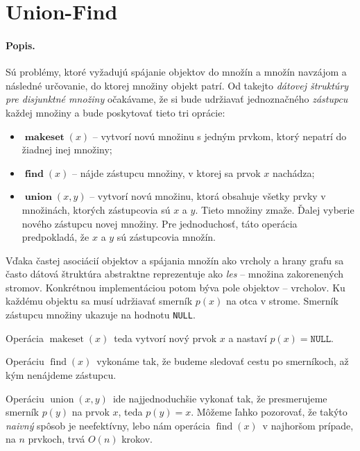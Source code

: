 \def\uf{Union-Find}
\def\null{\texttt{NULL}}
\def\makeset{$\mathop{makeset}(x)$}
\def\find{$\mathop{find}(x)$}
\def\union{$\mathop{union}(x, y)$}

\section{\uf}
\paragraph{Popis.}
Sú problémy, ktoré vyžadujú spájanie objektov do množín a množín navzájom 
a následné určovanie, do ktorej množiny objekt patrí. Od takejto \emph{
dátovej štruktúry pre disjunktné množiny} očakávame, že si bude udržiavať 
jednoznačného \emph{zástupcu} každej množiny a bude poskytovať 
tieto tri oprácie: 
\begin{itemize}
\item $\mathop{\mathbf{makeset}}(x)$ -- vytvorí novú množinu s jedným prvkom, 
ktorý nepatrí do žiadnej inej množiny;
\item $\mathop{\mathbf{find}}(x)$ -- nájde zástupcu množiny, v ktorej sa 
prvok $x$ nachádza;
\item $\mathop{\mathbf{union}}(x, y)$ -- vytvorí novú množinu, ktorá obsahuje 
všetky prvky v množinách, ktorých zástupcovia sú $x$ a $y$. Tieto 
množiny zmaže. Ďalej vyberie nového zástupcu novej množiny. Pre 
jednoduchosť, táto operácia predpokladá, že $x$ a $y$ sú 
zástupcovia množín.
\end{itemize}
Vďaka častej asociácií objektov a spájania množín ako vrcholy a hrany grafu 
sa často dátová štruktúra abstraktne reprezentuje ako 
\emph{les} -- množina zakorenených stromov. 
Konkrétnou implementáciou potom býva pole objektov -- vrcholov. Ku každému 
objektu sa musí udržiavať smerník $p(x)$ na otca v strome. Smerník zástupcu 
množiny ukazuje na hodnotu \null.

Operácia \makeset\ teda vytvorí nový prvok $x$ a nastaví $p(x) = \null$. 

Operáciu \find\ vykonáme tak, že budeme sledovať cestu po smerníkoch, až 
kým nenájdeme zástupcu. 

Operáciu \union\ ide najjednoduchšie vykonať tak, že presmerujeme smerník 
$p(y)$ na prvok $x$, teda $p(y) = x$. 
Môžeme ľahko pozorovať, že takýto \emph{naivný} spôsob je neefektívny, 
lebo nám operácia \find\ v najhoršom prípade, na $n$ prvkoch, trvá $O(n)$ 
krokov. 

